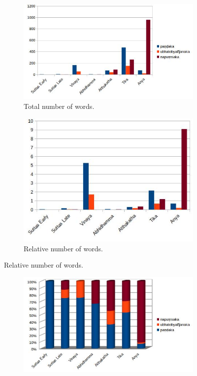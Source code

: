 \begin{figure}[!h]
  \begin{subfigure}{0.564\linewidth}
    \includegraphics[width=\linewidth]{pali.jpg}
    \caption{Total number of words.}
  \end{subfigure}
  \hfill
  \begin{subfigure}{0.436\linewidth}
    \includegraphics[width=\linewidth]{pali_weighted.jpg}
    \caption{Relative number of words.}
  \end{subfigure}
\setcounter{figure}{2}
\label{pali1}
\end{figure}

\begin{figure}[!h]
  \begin{subfigure}{\linewidth}
  \begin{center}
    \includegraphics[width=0.5\linewidth]{pali_perc.jpg}
  \end{center}
  \end{subfigure}
\setcounter{figure}{3}
\label{pali2}
\end{figure}

